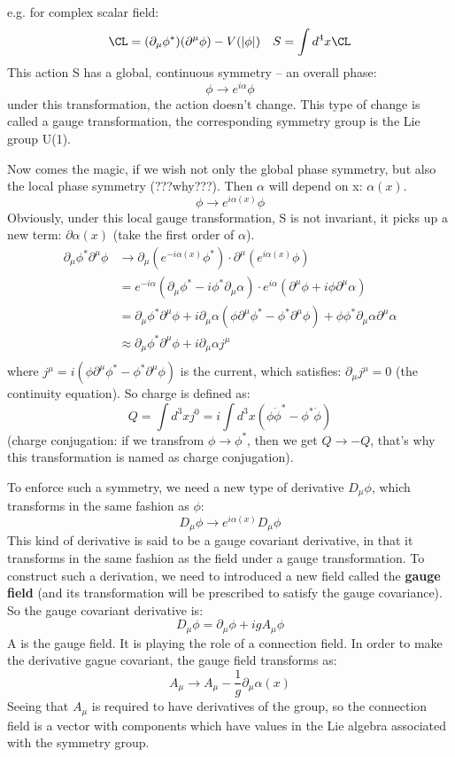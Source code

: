 e.g. for complex scalar field:
$$ \CL = (\partial_\mu\phi^*)(\partial^\mu\phi) - V(|\phi|) \quad S = \int d^4x\CL $$
This action S has a global, continuous symmetry -- an overall phase:
$$ \phi \rightarrow e^{i\alpha}\phi $$
under this transformation, the action doesn't change. This type of change is
called a gauge transformation, the corresponding symmetry group is the Lie 
group U(1).

Now comes the magic, if we wish not only the global phase symmetry, but also
the local phase symmetry (???why???). Then $\alpha$ will depend on x: $\alpha(x)$.
$$ \phi \rightarrow e^{i\alpha(x)}\phi $$
Obviously, under this local gauge transformation, S is not invariant, it picks
up a new term: $\partial \alpha(x)$ (take the first order of $\alpha$). 
\begin{equation*}
    \begin{aligned}
	\partial_\mu \phi^*\partial^\mu\phi &\rightarrow 
	\partial_\mu (e^{-i\alpha(x)}\phi^*) \cdot \partial^\mu(e^{i\alpha(x)}\phi)	\\
	&= e^{-i\alpha}(\partial_\mu\phi^* - i\phi^*\partial_\mu\alpha) \cdot
	   e^{i\alpha}(\partial^\mu\phi + i\phi\partial^\mu\alpha)  \\
	&= \partial_\mu\phi^*\partial^\mu\phi + 
	    i\partial_\mu\alpha(\phi\partial^\mu\phi^* - \phi^*\partial^\mu\phi) 
	    + \phi\phi^*\partial_\mu\alpha\partial^\mu\alpha \\
	&\approx \partial_\mu\phi^*\partial^\mu\phi + 
	    i\partial_\mu\alpha j^\mu	\\
    \end{aligned}
\end{equation*}
where $j^\mu = i(\phi\partial^\mu\phi^* - \phi^*\partial^\mu\phi)$ is the current,
which satisfies: $\partial_\mu j^\mu = 0$ (the continuity equation). 
So charge is defined as:
$$ Q = \int d^3x j^0 = i\int d^3x (\phi\dot{\phi}^* - \phi^*\dot{\phi}) $$
(charge conjugation: if we transfrom $\phi\rightarrow \phi^*$, then we get
$Q \rightarrow -Q$, that's why this transformation is named as charge conjugation).

To enforce such a symmetry, we need a new
type of derivative $D_\mu\phi$, which transforms in the same fashion as $\phi$:
$$ D_\mu\phi \rightarrow e^{i\alpha(x)}D_\mu\phi $$
This kind of derivative is said to be a gauge covariant derivative, in that it 
transforms in the same fashion as the field under a gauge transformation. To 
construct such a derivation, we need to introduced a new field called the 
\textbf{gauge field} (and its transformation will be prescribed to satisfy the 
gauge covariance). So the gauge covariant derivative is:
$$ D_\mu\phi = \partial_\mu\phi + igA_\mu\phi $$
A is the gauge field. It is playing the role of a connection field. In order to
make the derivative gague covariant, the gauge field transforms as:
$$ A_\mu \rightarrow A_\mu - \frac{1}{g}\partial_\mu\alpha(x) $$
Seeing that $A_\mu$ is required to have derivatives of the group, so the 
connection field is a vector with components which have values in the Lie 
algebra associated with the symmetry group.

